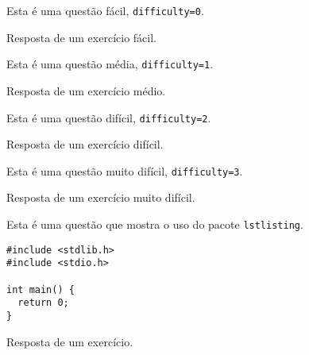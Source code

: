 \begin{Exercise}[label={easy}, difficulty=0]
  Esta é uma questão fácil, \verb+difficulty=0+.
\end{Exercise}
\begin{Answer}[ref={easy}]
  Resposta de um exercício fácil.
\end{Answer}
\begin{Exercise}[label={medium}, difficulty=1]
  Esta é uma questão média, \verb+difficulty=1+.
\end{Exercise}
\begin{Answer}[ref={medium}]
  Resposta de um exercício médio.
\end{Answer}
\begin{Exercise}[label={hard}, difficulty=2]
  Esta é uma questão difícil, \verb+difficulty=2+.
\end{Exercise}
\begin{Answer}[ref={hard}]
  Resposta de um exercício difícil.
\end{Answer}
\begin{Exercise}[label={veryhard}, difficulty=3]
  Esta é uma questão muito difícil, \verb+difficulty=3+.
\end{Exercise}
\begin{Answer}[ref={veryhard}]
  Resposta de um exercício muito difícil.
\end{Answer}
\begin{Exercise}[label={lstlisting}, difficulty=0]
  Esta é uma questão que mostra o uso do pacote \verb+lstlisting+.
  \begin{lstlisting}
#include <stdlib.h>
#include <stdio.h>

int main() {
  return 0;
}
  \end{lstlisting}
\end{Exercise}
\begin{Answer}[ref={lstlisting}]
  Resposta de um exercício.
\end{Answer}
